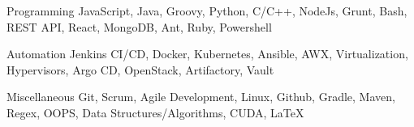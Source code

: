 

\begin{cvskills}

  \cvskill
    {Programming} %
    {JavaScript, Java, Groovy, Python, C/C++, NodeJs, Grunt, Bash, REST API, React, MongoDB, Ant, Ruby, Powershell} %

  \cvskill
    {Automation} %
    {Jenkins CI/CD, Docker, Kubernetes, Ansible, AWX, Virtualization, Hypervisors, Argo CD, OpenStack, Artifactory, Vault} %

  \cvskill
    {Miscellaneous} %
    {Git, Scrum, Agile Development, Linux, Github, Gradle, Maven, Regex, OOPS, Data Structures/Algorithms, CUDA, \LaTeX} %

\end{cvskills}
